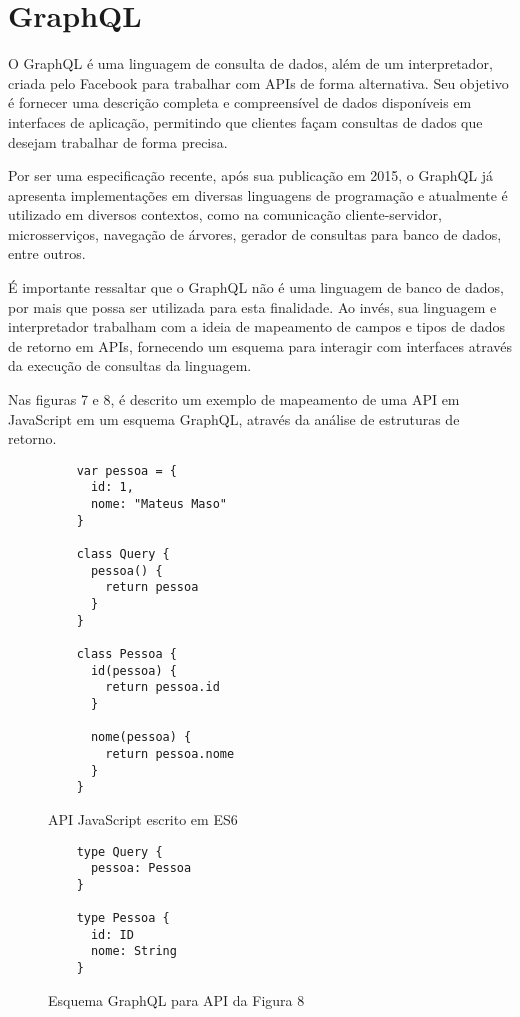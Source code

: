 \chapter{GraphQL}

O GraphQL é uma linguagem de consulta de dados, além de um interpretador, criada pelo Facebook para trabalhar com APIs de forma alternativa. Seu objetivo é fornecer uma descrição completa e compreensível de dados disponíveis em interfaces de aplicação, permitindo que clientes façam consultas de dados que desejam trabalhar de forma precisa. \cite{Facebook2016}

Por ser uma especificação recente, após sua publicação em 2015, o GraphQL já apresenta implementações em diversas linguagens de programação e atualmente é utilizado em diversos contextos, como na comunicação cliente-servidor, microsserviços, navegação de árvores, gerador de consultas para banco de dados, entre outros.

É importante ressaltar que o GraphQL não é uma linguagem de banco de dados, por mais que possa ser utilizada para esta finalidade. Ao invés, sua linguagem e interpretador trabalham com a ideia de mapeamento de campos e tipos de dados de retorno em APIs, fornecendo um esquema para interagir com interfaces através da execução de consultas da linguagem. \cite{Facebook2016}

Nas figuras 7 e 8, é descrito um exemplo de mapeamento de uma API em JavaScript em um esquema GraphQL, através da análise de estruturas de retorno.

\begin{figure}[H]
  \centering
  \begin{verbatim}
    var pessoa = {
      id: 1,
      nome: "Mateus Maso"
    }

    class Query {
      pessoa() {
        return pessoa
      }
    }

    class Pessoa {
      id(pessoa) {
        return pessoa.id
      }

      nome(pessoa) {
        return pessoa.nome
      }
    }
  \end{verbatim}
  \caption{API JavaScript escrito em ES6}
\end{figure}

\begin{figure}[H]
  \centering
  \begin{verbatim}
    type Query {
      pessoa: Pessoa
    }

    type Pessoa {
      id: ID
      nome: String
    }
  \end{verbatim}
  \caption{Esquema GraphQL para API da Figura 8}
\end{figure}

